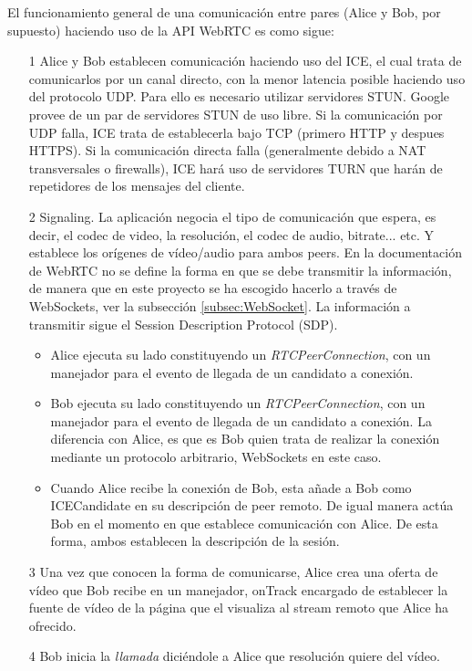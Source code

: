 El funcionamiento general de una comunicación entre pares (Alice y Bob, por supuesto) haciendo uso de la API WebRTC es como sigue: 
\begin{itemize}
\item[1] Alice y Bob establecen comunicación haciendo uso del ICE, el cual trata de comunicarlos por un canal directo, con la menor latencia posible haciendo uso del protocolo UDP. Para ello es necesario utilizar servidores STUN. Google provee de un par de servidores STUN de uso libre. Si la comunicación por UDP falla, ICE trata de establecerla bajo TCP (primero HTTP y despues HTTPS). Si la comunicación directa falla (generalmente debido a NAT transversales o firewalls), ICE hará uso de servidores TURN que harán de repetidores de los mensajes del cliente.
\item[2] Signaling. La aplicación negocia el tipo de comunicación que espera, es decir, el codec de video, la resolución, el codec de audio, bitrate... etc. Y establece los orígenes de vídeo/audio para ambos peers. En la documentación de WebRTC no se define la forma en que se debe transmitir la información, de manera que en este proyecto se ha escogido hacerlo a través de WebSockets, ver la subsección \ref{subsec:WebSocket}. La información a transmitir sigue el Session Description Protocol (SDP).

\begin{itemize}
\item Alice ejecuta su lado constituyendo un \textit{RTCPeerConnection}, con un manejador para el evento de llegada de un candidato a conexión.
\item Bob ejecuta su lado constituyendo un \textit{RTCPeerConnection}, con un manejador para el evento de llegada de un candidato a conexión. La diferencia con Alice, es que es Bob quien trata de realizar la conexión mediante un protocolo arbitrario, WebSockets en este caso. 
\item Cuando Alice recibe la conexión de Bob, esta añade a Bob como ICECandidate en su descripción de peer remoto. De igual manera actúa Bob en el momento en que establece comunicación con Alice. De esta forma, ambos establecen la descripción de la sesión.
\end{itemize}
\item[3] Una vez que conocen la forma de comunicarse, Alice crea una oferta de vídeo que Bob recibe en un manejador, onTrack encargado de establecer la fuente de vídeo de la página que el visualiza al stream remoto que Alice ha ofrecido.
\item[4] Bob inicia la \textit{llamada} diciéndole a Alice que resolución quiere del vídeo.
\end{itemize}

